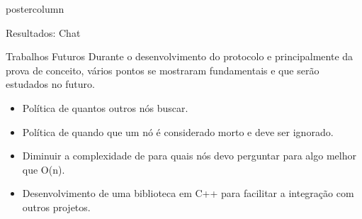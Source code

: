 \documentclass[final]{beamer}
\begin{document}
\begin{frame}
\begin{columns}
\begin{column}{.5\textwidth}
\begin{beamercolorbox}[center,wd=\textwidth]{postercolumn}
\begin{minipage}[T]{.95\textwidth}
{\begin{block}{Resultados: Chat}
                \vspace*{0.2cm}
            \end{block}
            
            \vspace*{0.2cm} 
            \begin{block}{Trabalhos Futuros}
                Durante o desenvolvimento do protocolo e principalmente da prova de conceito, vários pontos se mostraram fundamentais e que serão estudados no futuro.
                
                \begin{itemize}
                  \item Política de quantos outros nós buscar.
                  \item Política de quando que um nó é considerado morto e deve ser ignorado.
                  \item Diminuir a complexidade de para quais nós devo perguntar para algo melhor que O(n).
                  \item Desenvolvimento de uma biblioteca em C++ para facilitar a integração com outros projetos.
                \end{itemize}
                
                \vspace*{0.2cm} 
            \end{block}
            
            \vfill
          }
        \end{minipage}
      \end{beamercolorbox}
    \end{column}


  \end{columns}
\end{frame}
\end{document}
